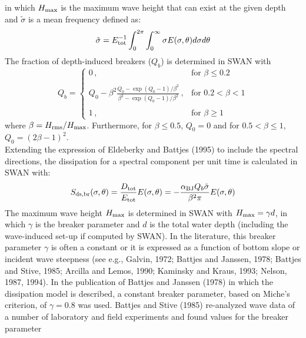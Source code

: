 \documentclass[12pt]{book}
\begin{document}
in which $H_{\rm max}$ is the maximum wave height that can exist at the given depth and ${\tilde{\sigma}}$
is a mean frequency defined as:
\begin{equation}
  \tilde{\sigma} = E^{-1}_{\rm tot} \int_{0}^{2\pi} \int_{0}^{\infty} \sigma E(\sigma,\theta) d\sigma d\theta
  \label{eq3-24}
\end{equation}
The fraction of depth-induced breakers ($Q_b$) is determined in SWAN with
\begin{equation}
   Q_b =
    \left\{
      \begin{array}{ll}
         0 \, , & \mbox{for } \beta \leq 0.2 \\
         \\
         Q_0 - \beta^2 \frac{Q_0 - \exp{(Q_0 - 1)/\beta^2}}{\beta^2 - \exp{(Q_0 - 1)/\beta^2}}
         \, , & \mbox{for }  0.2 < \beta < 1\\
         \\
         1 \, , & \mbox{for }  \beta \geq 1
      \end{array}
    \right.
  \label{eq3-25}
\end{equation}
where $\beta = H_{\rm rms}/H_{\rm max}$. Furthermore, for $\beta \leq 0.5$, $Q_0 = 0$ and for
$0.5 < \beta \leq 1$, $Q_0 = (2\beta-1)^2$.
\\[2ex]
\noindent
Extending the expression of Eldeberky and Battjes (1995) to include the spectral directions, the
dissipation for a spectral component per unit time is calculated in SWAN with:
\begin{equation}
  S_{\rm ds,br} (\sigma,\theta) = \frac{D_{\rm tot}}{E_{\rm tot}} E(\sigma,\theta) =
  -\frac{\alpha_{\rm BJ} Q_b \tilde{\sigma}}{\beta^2 \pi} E(\sigma,\theta)
  \label{eq3-26}
\end{equation}
The maximum wave height $H_{\rm max}$ is determined in SWAN with $H_{\rm max} = \gamma d$, in which $\gamma$ is the breaker parameter
and $d$ is the total water depth (including the wave-induced set-up if computed by SWAN). In the literature,
this breaker parameter $\gamma$ is often a constant or it is expressed as a function of bottom slope or incident
wave steepness (see e.g., Galvin, 1972; Battjes and Janssen, 1978; Battjes and Stive, 1985; Arcilla and
Lemos, 1990; Kaminsky and Kraus, 1993; Nelson, 1987, 1994).
In the publication of Battjes and Janssen (1978) in which the dissipation model is described, a constant
breaker parameter, based on Miche's criterion, of $\gamma=0.8$ was used. Battjes and Stive (1985) re-analyzed
wave data of a number of laboratory and field experiments and found values for the breaker parameter
\end{document}

